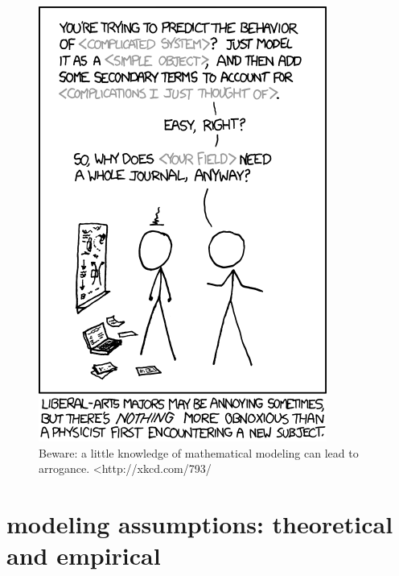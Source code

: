 \documentclass[
  letterpaper,
  DIV=11,
  numbers=noendperiod]{scrreprt}
\begin{document}
\begin{figure}

\includegraphics{./images/physicists_xkcd.png} \hfill{}

\caption{Beware: a little knowledge of mathematical modeling can lead to
arrogance. \textless http://xkcd.com/793/}

\end{figure}

\hypertarget{modeling-assumptions-theoretical-and-empirical}{%
\section*{modeling assumptions: theoretical and
empirical}\label{modeling-assumptions-theoretical-and-empirical}}
\end{document}
